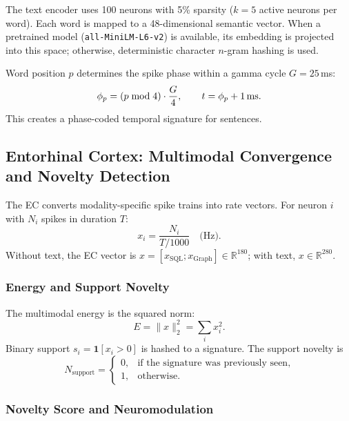 The text encoder uses 100 neurons with 5\% sparsity ($k=5$ active neurons per word). Each word is mapped to a 48-dimensional semantic vector. When a pretrained model (\texttt{all-MiniLM-L6-v2}) is available, its embedding is projected into this space; otherwise, deterministic character $n$-gram hashing is used.

Word position $p$ determines the spike phase within a gamma cycle $G = 25$\,ms:
\begin{equation}
\phi_p = (p \bmod 4) \cdot \frac{G}{4}, \qquad t = \phi_p + 1\text{\,ms}.
\end{equation}
This creates a phase-coded temporal signature for sentences.


\subsection{Entorhinal Cortex: Multimodal Convergence and Novelty Detection}
\label{sec:ec}

The EC converts modality-specific spike trains into rate vectors. For neuron $i$ with $N_i$ spikes in duration $T$:
\begin{equation}
x_i = \frac{N_i}{T/1000}\quad\text{(Hz)}.
\end{equation}
Without text, the EC vector is $x = [x_{\mathrm{SQL}}; x_{\mathrm{Graph}}] \in \mathbb{R}^{180}$; with text, $x \in \mathbb{R}^{280}$.

\subsubsection{Energy and Support Novelty}

The multimodal energy is the squared norm:
\begin{equation}
E = \|x\|_2^2 = \sum_i x_i^2.
\end{equation}
Binary support $s_i = \mathbf{1}[x_i > 0]$ is hashed to a signature. The support novelty is
\begin{equation}
N_{\mathrm{support}} =
\begin{cases}
0, & \text{if the signature was previously seen}, \\
1, & \text{otherwise}.
\end{cases}
\end{equation}

\subsubsection{Novelty Score and Neuromodulation}

